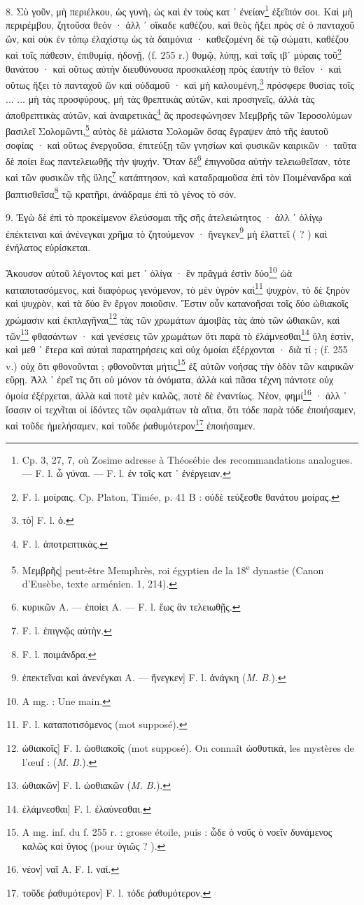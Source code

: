 \documentclass[a4paper, 11pt, oneside, polutonikogreek, french]{article}
\begin{document}
8. Σὺ γοῦν, μὴ περιέλκου, ὡς γυνὴ, ὡς καὶ ἐν τοὺς κατ ᾽ ἐνείαν\footnote{Cp. 3, 27, 7, où Zosime adresse à Théosébie des recommandations analogues. --- F. l. ὧ γύναι. --- F. l. ἐν τοῖς κατ ᾽ ἐνέργειαν.} ἐξεῖπόν σοι. Καὶ μὴ περιρέμβου, ζητοῦσα θεόν · ἀλλ ᾽ οἴκαδε καθέζου, καὶ θεὸς ἥξει πρὸς σὲ ὁ πανταχοῦ ὢν, καὶ οὐκ ἐν τόπῳ ἐλαχίστῳ ὡς τὰ δαιμόνια · καθεζομένη δὲ τῷ σώματι, καθέζου καὶ τοῖς πάθεσιν, ἐπιθυμίᾳ, ἡδονῇ, (f. 255 r.) θυμῷ, λύπῃ, καὶ ταῖς ιβʹ μύραις τοῦ\footnote{F. l. μοίραις. Cp. Platon, Timée, p. 41 B : οὐδὲ τεύξεσθε θανάτου μοίρας.} θανάτου · καὶ οὕτως αὐτὴν διευθύνουσα προσκαλέσῃ πρὸς ἐαυτὴν τὸ θεῖον · καὶ οὕτως ἥξει τὸ πανταχοῦ ὢν καὶ οὐδαμοῦ · καὶ μὴ καλουμένη,\footnote{τὸ] F. l. ὁ.} πρόσφερε θυσίας τοῖς ... ... μὴ τὰς προσφύρους, μὴ τὰς θρεπτικὰς αὐτῶν, καὶ προσηνεῖς, ἀλλὰ τὰς ἀποθρεπτικὰς αὐτῶν, καὶ ὰναιρετικὰς\footnote{F. l. ἀποτρεπτικὰς.} ἃς προσεφώνησεν Μεμβρῆς τῶν Ἱεροσολύμων βασιλεῖ Σολομῶντι,\footnote{Mεμβρῆς] peut-être Memphrès, roi égyptien de la 18\textsuperscript{e} dynastie (Canon d'Eusèbe, texte arménien. 1, 214).} αὐτὸς δὲ μάλιστα Σολομῶν ὅσας ἔγραψεν ἀπὸ τῆς ἑαυτοῦ σοφίας · καὶ οὕτως ἐνεργοῦσα, ἐπιτεύξῃ τῶν γνησίων καὶ φυσικῶν καιρικῶν · ταῦτα δὲ ποίει ἕως παντελειωθῇς τὴν ψυχήν. Ὅταν δὲ\footnote{κυρικῶν A. --- ἐποίει A. --- F. l. ἕως ἂν τελειωθῇς.} ἐπιγνοῦσα αὐτὴν τελειωθεῖσαν, τότε καὶ τῶν φυσικῶν τῆς ὕλης\footnote{F. l. ἐπιγνῷς αὐτὴν.} κατάπτησον, καὶ καταδραμοῦσα ἐπὶ τὸν Ποιμένανδρα καὶ βαπτισθεῖσα\footnote{F. l. ποιμάνδρα.} τῷ κρατῆρι, ἀνάδραμε ἐπὶ τὸ γένος τὸ σόν.

9. Ἐγὼ δὲ ἐπὶ τὸ προκείμενον ἐλεύσομαι τῆς σῆς ἀτελειώτητος · ἀλλ ᾽ ὀλίγῳ ἐπέκτειναι καὶ ἀνένεγκαι χρῆμα τὸ ζητούμενον · ἤνεγκεν\footnote{ἐπεκτεῖναι καὶ ἀνενέγκαι A. --- ἤνεγκεν] F. l. ἀνάγκη (\emph{M. B.}).} μὴ ἐλαττεῖ ( ? ) καὶ ἐνήλατος εὑρίσκεται.

Ἄκουσον αὐτοῦ λέγοντος καὶ μετ ᾽ ὀλίγα · ἓν πρᾶγμά ἐστὶν δύο\footnote{A mg. : Une main.} ὠὰ καταποτασόμενος, καὶ διαφόρως γενόμενον, τὸ μὲν ὑγρὸν καὶ\footnote{F. l. καταποτισόμενος (mot supposé).} ψυχρὸν, τὸ δὲ ξηρὸν καὶ ψυχρὸν, καὶ τὰ δύο ἓν ἔργον ποιοῦσιν. Ἔστιν οὖν κατανοῆσαι τοῖς δύο ὠθιακοῖς χρώμασιν καὶ ἐκπλαγῆναι\footnote{ὠθιακοῖς] F. l. ὠοθιακοῖς (mot supposé). On connaît ὠοθυτικά, les mystères de l'œuf : (\emph{M. B.}).} τὰς τῶν χρωμάτων ἀμοιβὰς τὰς ἀπὸ τῶν ὠθιακῶν, καὶ τῶν\footnote{ὠθιακῶν] F. l. ὠοθιακῶν (\emph{M. B.}).} φθασάντων · καὶ γενέσεις τῶν χρωμάτων ὅτι παρὰ τὸ ἐλάμνεσθαι\footnote{ἐλάμνεσθαι] F. l. ἐλαύνεσθαι.} ὕλη ἐστὶν, καὶ μεθ ᾽ ἕτερα καὶ αὐταὶ παρατηρήσεις καὶ οὐχ ὁμοίαι ἐξέρχονται · διὰ τί ; (f. 255 v.) οὐχ ὅτι φθονοῦνται ; φθονοῦνται μήτις\footnote{A mg. inf. du f. 255 r. : grosse étoile, puis : ὧδε ὁ νοῦς ὁ νοεῖν δυνάμενος καλῶς καὶ ὕγιος (pour ὑγιῶς ? ).} ἐξ αὐτῶν νοήσας τὴν ὁδὸν τῶν καιρικῶν εὕρῃ. Ἀλλ ᾽ ἐρεῖ τις ὅτι οὐ μόνον τὰ ὀνόματα, ἀλλὰ καὶ πᾶσα τέχνη πάντοτε οὐχ ὁμοία ἐξέρχεται, ἀλλὰ καὶ ποτὲ μὲν καλῶς, ποτὲ δὲ ἐναντίως. Νέον, φημί\footnote{νέον] ναἵ A. F. l. ναί.} · ἀλλ ᾽ ἴσασιν οἱ τεχνῖται οἱ ἰδόντες τῶν σφαλμάτων τὰ αἴτια, ὅτι τόδε παρὰ τόδε ἐποιήσαμεν, καὶ τοῦδε ἡμελήσαμεν, καὶ τοῦδε ῥαθυμότερον\footnote{τοῦδε ῥαθυμότερον] F. l. τόδε ῥαθυμότερον.} ἐποιήσαμεν.
\end{document}
